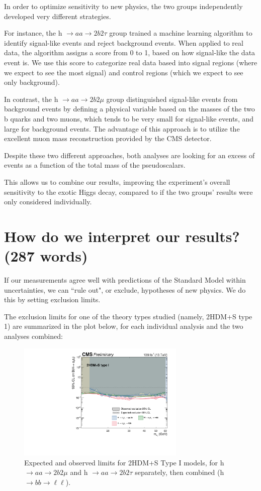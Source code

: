 \documentclass{article}
\begin{document}
In order to optimize sensitivity to new physics, the two groups independently developed very different strategies.

For instance, the h $\rightarrow aa \rightarrow 2b 2\tau$ group trained a machine learning algorithm to identify signal-like events and reject background events. When applied to real data, the algorithm assigns a score from 0 to 1, 
based on how signal-like the data event is. We use this score to categorize real data based into signal regions (where we expect to see the most signal) and control regions (which we expect to see only background). 

In contrast, the h $\rightarrow aa \rightarrow 2b 2\mu$ group distinguished signal-like events from background events by defining a physical variable based on the masses of the two b quarks and two muons, which tends to be very small for signal-like events,
and large for background events. The advantage of this approach is to utilize the excellent muon mass reconstruction provided by the CMS detector. 

Despite these two different approaches, both analyses are looking for an excess of events as a function of the total mass of the pseudoscalars. 

This allows us to combine our results, improving the experiment's overall sensitivity to the exotic Higgs decay, compared to if the two groups' results were only considered individually. 

\section{How do we interpret our results? (287 words)}

If our measurements agree well with predictions of the Standard Model within uncertainties, we can ``rule out", or exclude, hypotheses of new physics. We do this by setting exclusion limits.

The exclusion limits for one of the theory types studied (namely, 2HDM+S type 1) are summarized in the plot below, for each individual analysis and the two analyses combined: 


    \begin{figure}[ht]
        \centering
        \includegraphics[width=8cm]{full_run2_plot_BRaa_Type1.pdf}
        \caption{Expected and observed limits for 2HDM+S Type I models, for h $\rightarrow aa \rightarrow 2b2\mu$ and h $\rightarrow aa \rightarrow 2b2\tau$ separately, then combined (h $\rightarrow bb \rightarrow \ell\ell$).}
    \end{figure}
\end{document}

